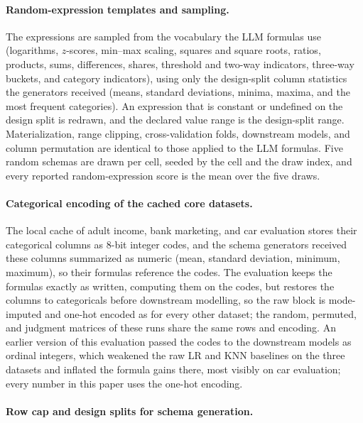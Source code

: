 \paragraph{Random-expression templates and sampling.}

The expressions are sampled from the vocabulary the LLM formulas use (logarithms, \(z\)-scores, min--max scaling, squares and square roots, ratios, products, sums, differences, shares, threshold and two-way indicators, three-way buckets, and category indicators), using only the design-split column statistics the generators received (means, standard deviations, minima, maxima, and the most frequent categories). An expression that is constant or undefined on the design split is redrawn, and the declared value range is the design-split range. Materialization, range clipping, cross-validation folds, downstream models, and column permutation are identical to those applied to the LLM formulas. Five random schemas are drawn per cell, seeded by the cell and the draw index, and every reported random-expression score is the mean over the five draws.

\paragraph{Categorical encoding of the cached core datasets.}

The local cache of adult income, bank marketing, and car evaluation stores their categorical columns as 8-bit integer codes, and the schema generators received these columns summarized as numeric (mean, standard deviation, minimum, maximum), so their formulas reference the codes. The evaluation keeps the formulas exactly as written, computing them on the codes, but restores the columns to categoricals before downstream modelling, so the raw block is mode-imputed and one-hot encoded as for every other dataset; the random, permuted, and judgment matrices of these runs share the same rows and encoding. An earlier version of this evaluation passed the codes to the downstream models as ordinal integers, which weakened the raw LR and KNN baselines on the three datasets and inflated the formula gains there, most visibly on car evaluation; every number in this paper uses the one-hot encoding.

\paragraph{Row cap and design splits for schema generation.}

